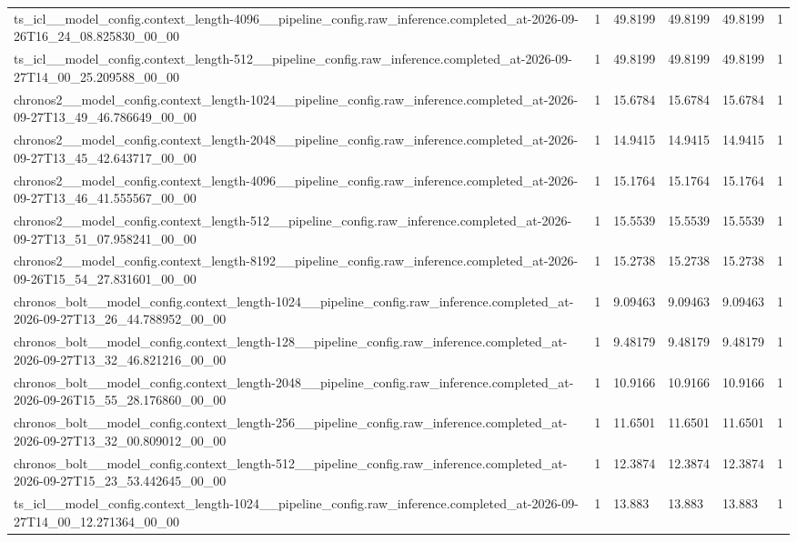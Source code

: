 \begin{tabular}{llllll}
ts\_icl\_\_model\_config.context\_length-4096\_\_pipeline\_config.raw\_inference.completed\_at-2026-09-26T16\_24\_08.825830\_00\_00 & 1 & 49.8199 & 49.8199 & 49.8199 & 1 \\
ts\_icl\_\_model\_config.context\_length-512\_\_pipeline\_config.raw\_inference.completed\_at-2026-09-27T14\_00\_25.209588\_00\_00 & 1 & 49.8199 & 49.8199 & 49.8199 & 1 \\
chronos2\_\_model\_config.context\_length-1024\_\_pipeline\_config.raw\_inference.completed\_at-2026-09-27T13\_49\_46.786649\_00\_00 & 1 & 15.6784 & 15.6784 & 15.6784 & 1 \\
chronos2\_\_model\_config.context\_length-2048\_\_pipeline\_config.raw\_inference.completed\_at-2026-09-27T13\_45\_42.643717\_00\_00 & 1 & 14.9415 & 14.9415 & 14.9415 & 1 \\
chronos2\_\_model\_config.context\_length-4096\_\_pipeline\_config.raw\_inference.completed\_at-2026-09-27T13\_46\_41.555567\_00\_00 & 1 & 15.1764 & 15.1764 & 15.1764 & 1 \\
chronos2\_\_model\_config.context\_length-512\_\_pipeline\_config.raw\_inference.completed\_at-2026-09-27T13\_51\_07.958241\_00\_00 & 1 & 15.5539 & 15.5539 & 15.5539 & 1 \\
chronos2\_\_model\_config.context\_length-8192\_\_pipeline\_config.raw\_inference.completed\_at-2026-09-26T15\_54\_27.831601\_00\_00 & 1 & 15.2738 & 15.2738 & 15.2738 & 1 \\
chronos\_bolt\_\_model\_config.context\_length-1024\_\_pipeline\_config.raw\_inference.completed\_at-2026-09-27T13\_26\_44.788952\_00\_00 & 1 & 9.09463 & 9.09463 & 9.09463 & 1 \\
chronos\_bolt\_\_model\_config.context\_length-128\_\_pipeline\_config.raw\_inference.completed\_at-2026-09-27T13\_32\_46.821216\_00\_00 & 1 & 9.48179 & 9.48179 & 9.48179 & 1 \\
chronos\_bolt\_\_model\_config.context\_length-2048\_\_pipeline\_config.raw\_inference.completed\_at-2026-09-26T15\_55\_28.176860\_00\_00 & 1 & 10.9166 & 10.9166 & 10.9166 & 1 \\
chronos\_bolt\_\_model\_config.context\_length-256\_\_pipeline\_config.raw\_inference.completed\_at-2026-09-27T13\_32\_00.809012\_00\_00 & 1 & 11.6501 & 11.6501 & 11.6501 & 1 \\
chronos\_bolt\_\_model\_config.context\_length-512\_\_pipeline\_config.raw\_inference.completed\_at-2026-09-27T15\_23\_53.442645\_00\_00 & 1 & 12.3874 & 12.3874 & 12.3874 & 1 \\
ts\_icl\_\_model\_config.context\_length-1024\_\_pipeline\_config.raw\_inference.completed\_at-2026-09-27T14\_00\_12.271364\_00\_00 & 1 & 13.883 & 13.883 & 13.883 & 1 \\

\end{tabular}
